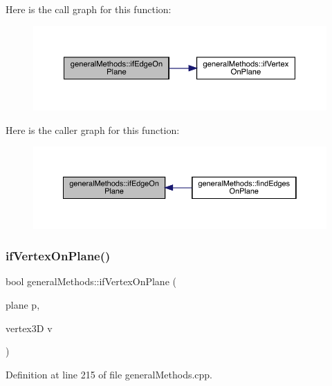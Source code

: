 Here is the call graph for this function\+:
\nopagebreak
\begin{figure}[H]
\begin{center}
\leavevmode
\includegraphics[width=350pt]{namespacegeneral_methods_a21d2e8c181e8cac3762d9ca1871d2168_cgraph}
\end{center}
\end{figure}
Here is the caller graph for this function\+:
\nopagebreak
\begin{figure}[H]
\begin{center}
\leavevmode
\includegraphics[width=350pt]{namespacegeneral_methods_a21d2e8c181e8cac3762d9ca1871d2168_icgraph}
\end{center}
\end{figure}
\mbox{\label{namespacegeneral_methods_a330682bb45234d8de5228a7607d493d2}} 
\subsubsection{\texorpdfstring{if\+Vertex\+On\+Plane()}{ifVertexOnPlane()}}
{\footnotesize\ttfamily bool general\+Methods\+::if\+Vertex\+On\+Plane (\begin{DoxyParamCaption}\item[{plane}]{p,  }\item[{vertex3D}]{v }\end{DoxyParamCaption})}



Definition at line 215 of file general\+Methods.\+cpp.

